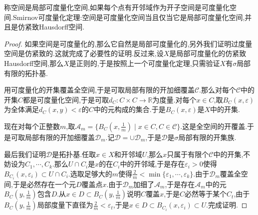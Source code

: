 称空间是局部可度量化空间,如果每个点有开邻域作为开子空间是可度量化空间.Smirnov可度量化定理:空间是可度量化空间当且仅当它是局部可度量化空间,并且是仿紧致Hausdorff空间.
\begin{proof}
	
	如果空间是可度量化的,那么它自然是局部可度量化的,另外我们证明过度量空间是仿紧致的.这就完成了必要性的证明.反过来,设$X$是局部可度量化的仿紧致Hausdorff空间,那么$X$是正则的,于是按照上一个可度量化定理,只需验证$X$有$\sigma$局部有限的拓扑基.
	
	用可度量化的开集覆盖全空间,于是可取局部有限的开加细覆盖$\mathscr{C}$.那么对每个$\mathscr{C}$中的开集$C$都是可度量化空间,于是可取$d_C:C\times C\to\mathbb{R}$为度量.对每个$x\in C$,取$B_C(x,\varepsilon)$为全体满足$d_C(x,y)<\varepsilon$的$C$中的元构成的集合.于是$B_C(x,\varepsilon)$是$X$中的开集.
	
	现在对每个正整数$m$,取$\mathscr{A}_m=\{B_C(x,\frac{1}{m})\mid x\in C,C\in\mathscr{C}\}$.这是全空间的开覆盖.于是可取局部有限的开加细覆盖$\mathscr{D}_m$.记$\mathscr{D}=\cup\mathscr{D}_m$,于是$\mathscr{D}$是$\sigma$局部有限的开集族.
	
	最后我们证明$\mathscr{D}$是拓扑基.任取$x\in X$和开邻域$U$,那么$x$只属于有限个$\mathscr{C}$中的开集,不妨设为$C_1,\cdots,C_k$.那么$U\cap C_i$是$x$的在$C_i$中的开邻域,于是存在$\varepsilon_i>0$使得$B_{C_i}(x,\varepsilon_i)\subset U\cap C_i$.选取足够大的$m$使得$\frac{2}{m}<\min\{\varepsilon_1,\cdots,\varepsilon_k\}$.由于$\mathscr{D}_m$覆盖全空间,于是必然存在一个元$D$覆盖点$x$.由于$\mathscr{D}_m$加细了$\mathscr{A}_m$,于是存在$\mathscr{A}_m$中的元$B_C(y,\frac{1}{m})$包含$D$.从$x\in D\subset B_C(y,\frac{1}{m})$说明$C$覆盖$x$,于是$C$必然等于某个$C_t$,由于$B_C(y,\frac{1}{m})$局部度量下直径为$\frac{2}{m}<\varepsilon_t$,于是$x\in D\subset B_{C_i}(x,\varepsilon_i)\subset U$.完成证明.
\end{proof}